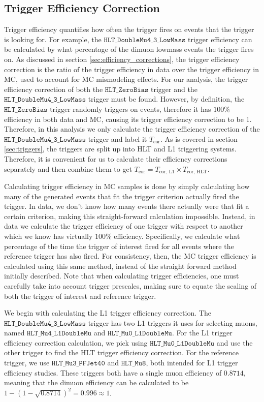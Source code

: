\subsection{Trigger Efficiency Correction}

Trigger efficiency quantifies how often the trigger fires on events that the trigger is looking for. For example, the $\texttt{HLT\_DoubleMu4\_3\_LowMass}$ trigger efficiency can be calculated by what percentage of the dimuon lowmass events the trigger fires on. As discussed in section \ref{sec:efficiency_corrections}, the trigger efficiency correction is the ratio of the trigger efficiency in data over the trigger efficiency in MC, used to account for MC mismodeling effects. For our analysis, the trigger efficiency correction of both the $\texttt{HLT\_ZeroBias}$ trigger and the $\texttt{HLT\_DoubleMu4\_3\_LowMass}$ trigger must be found. However, by definition, the $\texttt{HLT\_ZeroBias}$ trigger randomly triggers on events, therefore it has $100\%$ efficiency in both data and MC, causing its trigger efficiency correction to be 1. Therefore, in this analysis we only calculate the trigger efficiency correction of the $\texttt{HLT\_DoubleMu4\_3\_LowMass}$ trigger and label it $T_{\text{cor}}$. As is covered in section \ref{sec:triggers}, the triggers are split up into HLT and L1 triggering systems. Therefore, it is convenient for us to calculate their efficiency corrections separately and then combine them to get $T_{\text{cor}} = T_{\text{cor, L1}} \times T_{\text{cor, HLT}}$.

Calculating trigger efficiency in MC samples is done by simply calculating how many of the generated events that fit the trigger criterion actually fired the trigger. In data, we don't know how many events there actually were that fit a certain criterion, making this straight-forward calculation impossible. Instead, in data we calculate the trigger efficiency of one trigger with respect to another which we know has virtually $100\%$ efficiency. Specifically, we calculate what percentage of the time the trigger of interest fired for all events where the reference trigger has also fired. For consistency, then, the MC trigger efficiency is calculated using this same method, instead of the straight forward method initially described. Note that when calculating trigger efficiencies, one must carefully take into account trigger prescales, making sure to equate the scaling of both the trigger of interest and reference trigger. 

We begin with calculating the L1 trigger efficiency correction. The $\texttt{HLT\_DoubleMu4\_3\_LowMass}$ trigger has two L1 triggers it uses for selecting muons, named $\texttt{HLT\_Mu4\_L1DoubleMu}$ and $\texttt{HLT\_Mu0\_L1DoubleMu}$. For the L1 trigger efficiency correction calculation, we pick using $\texttt{HLT\_Mu0\_L1DoubleMu}$ and use the other trigger to find the HLT trigger efficiency correction. For the reference trigger, we use $\texttt{HLT\_Mu3\_PFJet40}$ and $\texttt{HLT\_Mu8}$, both intended for L1 trigger efficiency studies. These triggers both have a single muon efficiency of $0.8714$, meaning that the dimuon efficiency can be calculated to be $1- (1-\sqrt{0.8714})^2 = 0.996 \approx 1$. 

